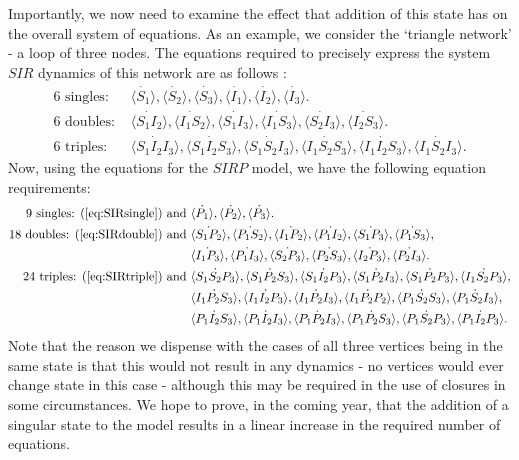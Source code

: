 \documentclass[../report.tex]{subfiles}
\begin{document}
Importantly, we now need to examine the effect that addition of this state has on the overall system of equations. As an example, we consider the `triangle network' - a loop of three nodes. The equations required to precisely express the system $SIR$ dynamics of this network are as follows \cite{kiss_2014}:
\begin{align}
\text{6 singles: } & \dot{\langle S_1 \rangle}, \dot{\langle S_2 \rangle}, \dot{\langle S_3 \rangle}, \dot{\langle I_1 \rangle}, \dot{\langle I_2 \rangle}, \dot{\langle I_3 \rangle}.\label{eq:SIRsingle}\\
\text{6 doubles: } & \dot{\langle S_1 I_2 \rangle},\dot{\langle I_1 S_2 \rangle}, \dot{\langle S_1 I_3 \rangle}, \dot{\langle I_1 S_3 \rangle}, \dot{\langle S_2 I_3\rangle}, \dot{\langle I_2 S_3 \rangle}.\label{eq:SIRdouble}\\
\text{6 triples: } & \dot{\langle S_1 I_2 I_3 \rangle}, \dot{\langle S_1 I_2 S_3 \rangle}, \dot{\langle S_1 S_2 I_3 \rangle}, \dot{\langle I_1 S_2 S_3 \rangle}, \dot{\langle I_1 I_2 S_3 \rangle}, \dot{\langle I_1 S_2 I_3 \rangle}. \label{eq:SIRtriple}
\end{align}
Now, using the equations for the $SIRP$ model, we have the following equation requirements:
\begin{align*}
\text{9 singles: (} \ref{eq:SIRsingle} \text{) and } & \dot{\langle P_1 \rangle}, \dot{\langle P_2 \rangle}, \dot{\langle P_3 \rangle}.\\
\text{18 doubles: (} \ref{eq:SIRdouble} \text{) and }& \dot{\langle S_1 P_2 \rangle},\dot{\langle P_1 S_2 \rangle}, \dot{\langle I_1 P_2 \rangle}, \dot{\langle P_1 I_2 \rangle}, \dot{\langle S_1 P_3\rangle}, \dot{\langle P_1 S_3 \rangle},\\ & \dot{\langle I_1 P_3 \rangle}, \dot{\langle P_1 I_3 \rangle}, \dot{\langle S_2 P_3 \rangle}, \dot{\langle P_2 S_3 \rangle}, \dot{\langle I_2 P_3 \rangle}, \dot{\langle P_2 I_3 \rangle}. \\
\text{24 triples: (} \ref{eq:SIRtriple} \text{) and } & \dot{\langle S_1 S_2 P_3 \rangle}, \dot{\langle S_1 P_2 S_3 \rangle}, \dot{\langle S_1 I_2 P_3\rangle}, \dot{\langle S_1 P_2 I_3 \rangle}, \dot{\langle S_1 P_2 P_3\rangle}, \dot{\langle I_1 S_2 P_3 \rangle},\\
&  \dot{\langle I_1 P_2 S_3 \rangle}, \dot{\langle I_1 I_2 P_3 \rangle}, \dot{\langle I_1 P_2 I_3 \rangle}, \dot{\langle I_1 P_2 P_2 \rangle},  \dot{\langle P_1 S_2 S_3 \rangle}, \dot{\langle P_1 S_2 I_3 \rangle},\\
&  \dot{\langle P_1 I_2 S_3 \rangle}, \dot{\langle P_1 I_2 I_3 \rangle}, \dot{\langle P_1 P_2 I_3 \rangle},  \dot{\langle P_1 P_2 S_3 \rangle}, \dot{\langle P_1 S_2 P_3 \rangle},  \dot{\langle P_1 I_2 P_3\rangle}.
\end{align*}
Note that the reason we dispense with the cases of all three vertices being in the same state is that this would not result in any dynamics - no vertices would ever change state in this case - although this may be required in the use of closures in some circumstances. We hope to prove, in the coming year, that the addition of a singular state to the model results in a linear increase in the required number of equations.
\end{document}

